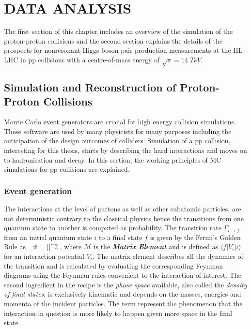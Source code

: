 \chapter{DATA ANALYSIS}\label{ch3}

The first section of this chapter includes an overview of the simulation of the proton-proton collisions and the second section explains the details of the prospects for nonresonant Higgs boson pair production measurements at the HL-LHC in pp collisions with a centre-of-mass energy of $\sqrt{s}=14\;TeV$.

\section{Simulation and Reconstruction of Proton-Proton Collisions}
Monte Carlo event generators are crucial for high energy collision simulations. These software are used by many physicists for many purposes including the anticipation of the design outcomes of colliders. Simulation of a pp collision, interesting for this thesis, starts by describing the hard interactions and moves on to hadronisation and decay. In this section, the working principles of MC simulations for pp collisions are explained.

\subsection{Event generation}

The interactions at the level of partons as well as other subatomic particles, are not deterministic contrary to the classical physics hence the transitions from one quantum state to another is computed as probability. The transition rate $\Gamma_{i\rightarrow f}$ from an initial quantum state $i$ to a final state $f$ is given by the Fermi's Golden Rule as
\be
\Gamma_{i\rightarrow f} = \frac{2\pi}{\hbar}||^2 \rho \; ,
\ee
where $\mathcal{M}$ is the \emph{\bf{Matrix Element}} and is defined as $\langle f|V_i|i\rangle$ for an interaction potential $V_i$. The matrix element describes all the dynamics of the transition and is calculated by evaluating the corresponding Feynman diagrams using the Feynman rules convenient to the interaction of interest. The second ingredient in the recipe is the \emph{phase space} available, also called the \emph{density of final states}, is exclusively kinematic and depends on the masses, energies and momenta of the incident particles. The term represent the phenomenon that the interaction in question is more likely to happen given more space in the final state.

